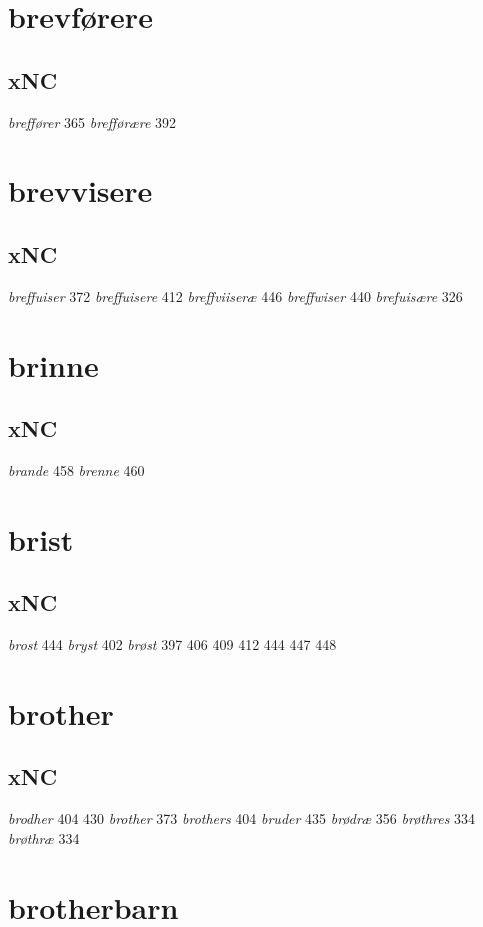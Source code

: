 \documentclass[a4paper,twocolumn]{article}
\begin{document}
\section{brevførere}
\label{sec:org54d00ef}
\subsection{xNC}
\label{sec:org5e5fb1f}
\emph{breffører} 365 \emph{brefførære} 392 
\section{brevvisere}
\label{sec:orga57975c}
\subsection{xNC}
\label{sec:orgcf4595c}
\emph{breffuiser} 372 \emph{breffuisere} 412 \emph{breffviiseræ} 446 \emph{breffwiser} 440 \emph{brefuisære} 326 
\section{brinne}
\label{sec:org7c0f7c5}
\subsection{xNC}
\label{sec:org04208c2}
\emph{brande} 458 \emph{brenne} 460 
\section{brist}
\label{sec:org304431b}
\subsection{xNC}
\label{sec:orgd9aed23}
\emph{brost} 444 \emph{bryst} 402 \emph{brøst} 397 406 409 412 444 447 448 
\section{brother}
\label{sec:org765ff33}
\subsection{xNC}
\label{sec:orge735a84}
\emph{brodher} 404 430 \emph{brother} 373 \emph{brothers} 404 \emph{bruder} 435 \emph{brødræ} 356 \emph{brøthres} 334 \emph{brøthræ} 334 
\section{brotherbarn}
\label{sec:orgd90b30b}
\end{document}
